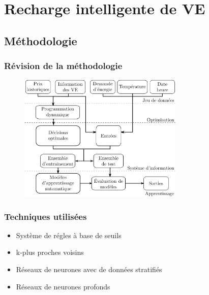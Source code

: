 \documentclass[french]{beamer}
\begin{document}
{\section{Recharge intelligente de VE}

\subsection{Méthodologie}



\begin{frame}
\frametitle{Révision de la méthodologie} 
\begin{figure}
\begin{center}
\includegraphics[width=0.7\textwidth]{artMeth2CompactFr.pdf}
\end{center}
\end{figure}
\end{frame}


\begin{frame}
\frametitle{Techniques utilisées} 
\begin{itemize}
\item Système de régles à base de seuils
\item k-plus proches voisins
\item Réseaux de neurones avec de données stratifiés
\item Réseaux de neurones profonds
\end{itemize}

\end{frame}


}
\end{document}

